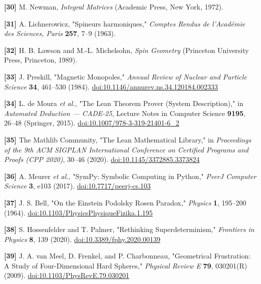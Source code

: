 \documentclass[a4paper,11pt]{article}
\begin{document}
\label{ref30}
\noindent \textbf{[30]} M. Newman, \textit{Integral Matrices} (Academic Press, New York, 1972).


\label{ref31}
\noindent \textbf{[31]} A. Lichnerowicz, "Spineurs harmoniques," \textit{Comptes Rendus de l'Académie des Sciences, Paris} \textbf{257}, 7–9 (1963).


\label{ref32}
\noindent \textbf{[32]} H. B. Lawson and M.-L. Michelsohn, \textit{Spin Geometry} (Princeton University Press, Princeton, 1989).


\label{ref33}
\noindent \textbf{[33]} J. Preskill, "Magnetic Monopoles," \textit{Annual Review of Nuclear and Particle Science} \textbf{34}, 461–530 (1984). \href{https://doi.org/10.1146/annurev.ns.34.120184.002333}{doi:10.1146/annurev.ns.34.120184.002333}


\label{ref34}
\noindent \textbf{[34]} L. de Moura \textit{et al.}, "The Lean Theorem Prover (System Description)," in \textit{Automated Deduction — CADE-25}, Lecture Notes in Computer Science \textbf{9195}, 26–48 (Springer, 2015). \href{https://doi.org/10.1007/978-3-319-21401-6_2}{doi:10.1007/978-3-319-21401-6\_2}


\label{ref35}
\noindent \textbf{[35]} The Mathlib Community, "The Lean Mathematical Library," in \textit{Proceedings of the 9th ACM SIGPLAN International Conference on Certified Programs and Proofs (CPP 2020)}, 30–46 (2020). \href{https://doi.org/10.1145/3372885.3373824}{doi:10.1145/3372885.3373824}


\label{ref36}
\noindent \textbf{[36]} A. Meurer \textit{et al.}, "SymPy: Symbolic Computing in Python," \textit{PeerJ Computer Science} \textbf{3}, e103 (2017). \href{https://doi.org/10.7717/peerj-cs.103}{doi:10.7717/peerj-cs.103}


\label{ref37}
\noindent \textbf{[37]} J. S. Bell, "On the Einstein Podolsky Rosen Paradox," \textit{Physics} \textbf{1}, 195–200 (1964). \href{https://doi.org/10.1103/PhysicsPhysiqueFizika.1.195}{doi:10.1103/PhysicsPhysiqueFizika.1.195}


\label{ref38}
\noindent \textbf{[38]} S. Hossenfelder and T. Palmer, "Rethinking Superdeterminism," \textit{Frontiers in Physics} \textbf{8}, 139 (2020). \href{https://doi.org/10.3389/fphy.2020.00139}{doi:10.3389/fphy.2020.00139}


\label{ref39}
\noindent \textbf{[39]} J. A. van Meel, D. Frenkel, and P. Charbonneau, "Geometrical Frustration: A Study of Four-Dimensional Hard Spheres," \textit{Physical Review E} \textbf{79}, 030201(R) (2009). \href{https://doi.org/10.1103/PhysRevE.79.030201}{doi:10.1103/PhysRevE.79.030201}
\end{document}
